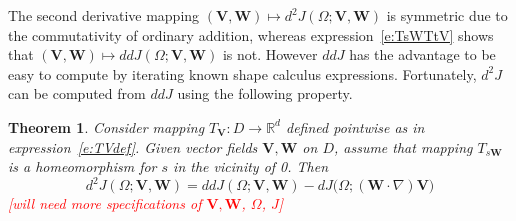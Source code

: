 \documentclass{article}
\newtheorem{theorem}{\textbf{Theorem}}[section]
\theoremstyle{remark}
\numberwithin{equation}{section}
\newcommand{\RR}{\mathbb{R}}
\let\bs\boldsymbol
\begin{document}
The second derivative mapping $(\bs V, \bs W) \mapsto d^2J(\Omega; \bs V, \bs W)$ is symmetric due to the commutativity of ordinary addition, whereas expression~\eqref{e:TsWTtV} shows that $(\bs V, \bs W) \mapsto ddJ(\Omega; \bs V, \bs W)$ is not.
However $ddJ$ has the advantage to be easy to compute by iterating known shape calculus expressions.
Fortunately, $d^2J$ can be computed from $dd J$ using the following property.
%
\begin{theorem}
Consider mapping $T_{\bs V}:D\to\RR^d$ defined pointwise as in expression~\eqref{e:TVdef}.
Given vector fields $\bs V, \bs W$ on $D$, assume that mapping $T_{s\bs W}$ is a homeomorphism for $s$ in the vicinity of 0. 
Then 
%
\begin{equation}
d^2 J(\Omega; \bs V, \bs W) = dd J(\Omega; \bs V, \bs W) - dJ\bigl(\Omega;(\bs W\cdot\nabla)\bs V \bigr)
\end{equation}
%
\textcolor{red}{[will need more specifications of $\bs V, \bs W$, $\Omega$, $J$]}
\end{theorem}
%
\end{document}
